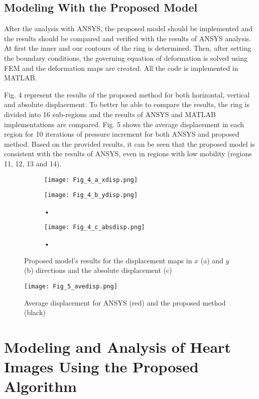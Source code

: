 \documentclass{jicspack}
\begin{document}
\subsection{Modeling With the Proposed Model}
After the analysis with ANSYS, the proposed model should be implemented and the results
should be compared and verified with the results of ANSYS analysis. At first the inner and our contours of the ring is determined. Then, after setting the boundary conditions, the governing equation of deformation is solved using FEM and the deformation maps are created. All the code is implemented in MATLAB. 

Fig. 4 represent the results of the proposed method for both horizontal, vertical and absolute displacement. To better be able to compare the results, the ring is divided into 16 sub-regions and the results of ANSYS and MATLAB implementations are compared. Fig. 5 shows the average displacement in each region for 10 iterations of pressure increment for both ANSYS and proposed method. Based on the provided results, it can be seen that the proposed model is consistent with the results of ANSYS, even in regions with low mobility (regions 11, 12, 13 and 14). 

\begin{figure}
\centering
\begin{subfigure}[b]{.4\textwidth}
\texttt{[image: Fig\_4\_a\_xdisp.png]}
\caption{}
\end{subfigure}
\begin{subfigure}[b]{0.4\textwidth}
\texttt{[image: Fig\_4\_b\_ydisp.png]}
\caption{•}
\end{subfigure}

\begin{subfigure}[b]{0.4\textwidth}
\texttt{[image: Fig\_4\_c\_absdisp.png]}
\caption{•}
\end{subfigure}
\caption{Proposed model's results for the displacement maps in $x$ (a) and $y$ (b) directions and the absolute displacement (c)}
\end{figure}

\begin{figure}
\centering
\texttt{[image: Fig\_5\_avedisp.png]}
\caption{Average displacement for ANSYS (red) and the proposed method (black)}
\end{figure}

\section{Modeling and Analysis of Heart Images Using the Proposed Algorithm }
\end{document}

